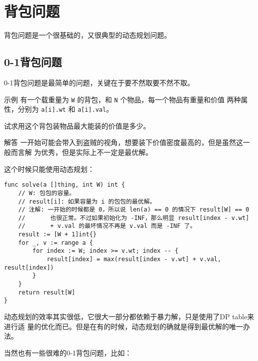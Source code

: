 
\section{背包问题}

背包问题是一个很基础的，又很典型的动态规划问题。

\subsection{0-1背包问题}

0-1背包问题是最简单的问题，关键在于要不然取要不然不取。

\begin{Exple}{示例}
有一个载重量为 \verb|W| 的背包，和 \verb|N| 个物品，每一个物品有重量和价值
两种属性，分别为 \verb|a[i].wt| 和 \verb|a[i].val|。

试求用这个背包装物品最大能装的价值是多少。
\end{Exple}
\begin{Exple}{解答}
一开始可能会带入到盗贼的视角，想要装下价值密度最高的，但是虽然这一般而言解
为优秀，但是实际上不一定是最优解。

这个时候只能使用动态规划：
\begin{lstlisting}
func solve(a []thing, int W) int {
    // W: 包包的容量。
    // result[i]: 如果容量为 i 的包包的最优解。
    // 注解: 一开始的时候都是 0，所以说 len(a) == 0 的情况下 result[W] == 0
    //       也很正常。不过如果初始化为 -INF，那么明显 result[index - v.wt]
    //       + v.val 的最坏情况不再是 v.val 而是 -INF 了。
    result := [W + 1]int{}
    for _, v := range a {
        for index := W; index >= v.wt; index -- {
            result[index] = max(result[index - v.wt] + v.val, result[index])
        }
    }
    return result[W]
}
\end{lstlisting}
\end{Exple}

动态规划的效率其实很低，它很大一部分都依赖于暴力解，只是使用了DP table来进行适
量的优化而已。但是在有的时候，动态规划的确就是得到最优解的唯一办法。

当然也有一些很难的0-1背包问题，比如：

